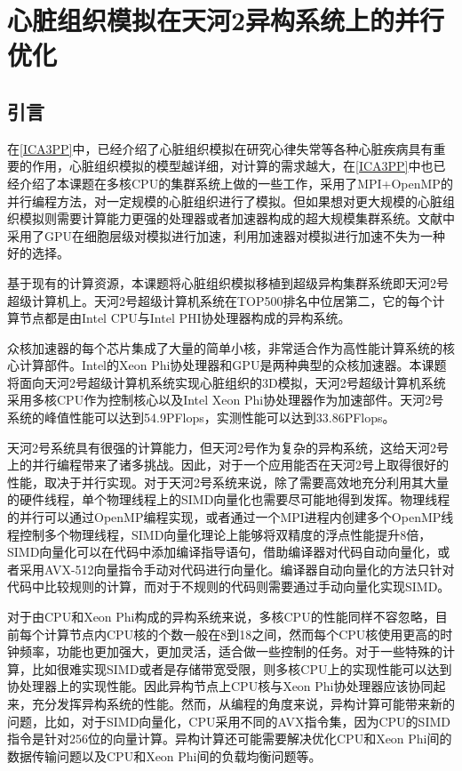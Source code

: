 \chapter{心脏组织模拟在天河2异构系统上的并行优化}
\label{icpads}

\section{引言}
在\ref{ICA3PP}中，已经介绍了心脏组织模拟在研究心律失常等各种心脏疾病具有重要的作用，心脏组织模拟的模型越详细，对计算的需求越大，在\ref{ICA3PP}中也已经介绍了本课题在多核CPU的集群系统上做的一些工作，采用了MPI+OpenMP的并行编程方法，对一定规模的心脏组织进行了模拟。但如果想对更大规模的心脏组织模拟则需要计算能力更强的处理器或者加速器构成的超大规模集群系统。文献中采用了GPU在细胞层级对模拟进行加速，利用加速器对模拟进行加速不失为一种好的选择。

基于现有的计算资源，本课题将心脏组织模拟移植到超级异构集群系统即天河2号超级计算机上。天河2号超级计算机系统在TOP500排名中位居第二，它的每个计算节点都是由Intel CPU与Intel PHI协处理器构成的异构系统。

众核加速器的每个芯片集成了大量的简单小核，非常适合作为高性能计算系统的核心计算部件。Intel的Xeon Phi协处理器和GPU是两种典型的众核加速器。本课题将面向天河2号超级计算机系统实现心脏组织的3D模拟，天河2号超级计算机系统采用多核CPU作为控制核心以及Intel Xeon Phi协处理器作为加速部件。天河2号系统的峰值性能可以达到54.9PFlops，实测性能可以达到33.86PFlops。

天河2号系统具有很强的计算能力，但天河2号作为复杂的异构系统，这给天河2号上的并行编程带来了诸多挑战。因此，对于一个应用能否在天河2号上取得很好的性能，取决于并行实现。对于天河2号系统来说，除了需要高效地充分利用其大量的硬件线程，单个物理线程上的SIMD向量化也需要尽可能地得到发挥。物理线程的并行可以通过OpenMP编程实现，或者通过一个MPI进程内创建多个OpenMP线程控制多个物理线程，SIMD向量化理论上能够将双精度的浮点性能提升8倍，SIMD向量化可以在代码中添加编译指导语句，借助编译器对代码自动向量化，或者采用AVX-512向量指令手动对代码进行向量化。编译器自动向量化的方法只针对代码中比较规则的计算，而对于不规则的代码则需要通过手动向量化实现SIMD。

对于由CPU和Xeon Phi构成的异构系统来说，多核CPU的性能同样不容忽略，目前每个计算节点内CPU核的个数一般在8到18之间，然而每个CPU核使用更高的时钟频率，功能也更加强大，更加灵活，适合做一些控制的任务。对于一些特殊的计算，比如很难实现SIMD或者是存储带宽受限，则多核CPU上的实现性能可以达到协处理器上的实现性能。因此异构节点上CPU核与Xeon Phi协处理器应该协同起来，充分发挥异构系统的性能。然而，从编程的角度来说，异构计算可能带来新的问题，比如，对于SIMD向量化，CPU采用不同的AVX指令集，因为CPU的SIMD指令是针对256位的向量计算。异构计算还可能需要解决优化CPU和Xeon Phi间的数据传输问题以及CPU和Xeon Phi间的负载均衡问题等。

